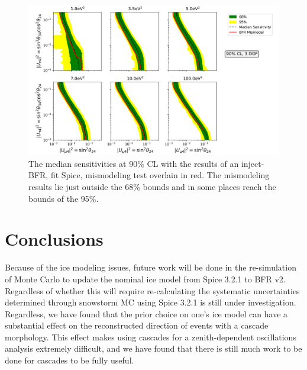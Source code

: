 \documentclass[main.tex]{subfiles}
\begin{document}
\begin{figure}
    \centering
    \includegraphics[width=0.9\linewidth]{figures/mismodel_median_sense_cl0.9.png}
    \caption{The median sensitivities at 90\% CL with the results of an inject-BFR, fit Spice, mismodeling test overlain in red. The mismodeling results lie just outside the 68\% bounds and in some places reach the bounds of the 95\%.}\label{fig:median_mismod}
\end{figure}

\section{Conclusions}

Because of the ice modeling issues, future work will be done in the re-simulation of Monte Carlo to update the nominal ice model from Spice 3.2.1 to BFR v2. 
Regardless of whether this will require re-calculating the systematic uncertainties determined through snowstorm MC using Spice 3.2.1 is still under investigation. 
Regardless, we have found that the prior choice on one's ice model can have a substantial effect on the reconstructed direction of events with a cascade morphology. 
This effect makes using cascades for a zenith-dependent oscillations analysis extremely difficult, and we have found that there is still much work to be done for cascades to be fully useful. 
\end{document}
